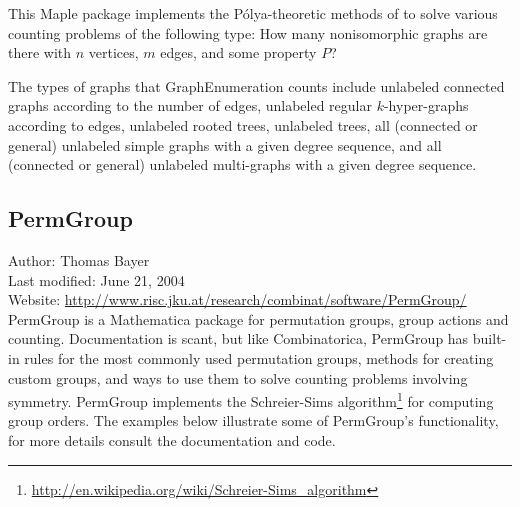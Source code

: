 \documentclass[12pt]{article}
\theoremstyle{plain}
\begin{document}
This Maple package implements the P\'olya-theoretic methods of \cite{graphical} to solve various counting problems of the following type: How many nonisomorphic graphs are there with \(n\) vertices, \(m\) edges, and some property \(P\)?

The types of graphs that GraphEnumeration counts include
unlabeled connected graphs according to the number of edges,
unlabeled regular \( k \)-hyper-graphs according to edges,
unlabeled rooted trees,
unlabeled trees,
all (connected or general) unlabeled simple graphs with a given degree sequence, and
all (connected or general) unlabeled multi-graphs with a given degree sequence.



\subsection{PermGroup}

Author: Thomas Bayer
\\
Last modified: June 21, 2004
\\
Website: \url{http://www.risc.jku.at/research/combinat/software/PermGroup/}
\\


PermGroup is a Mathematica package for permutation groups, group actions and counting.
Documentation is scant,
but like Combinatorica, PermGroup has built-in rules for the most commonly used permutation groups,  methods for creating custom groups, and ways to use them to solve counting problems involving symmetry.
PermGroup implements the Schreier-Sims algorithm\footnote{
 \url{http://en.wikipedia.org/wiki/Schreier-Sims_algorithm}
} for computing group orders.
The examples below illustrate some of PermGroup's functionality, for more details consult the documentation and code.
\end{document}
